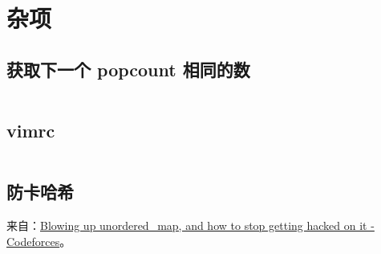 \section{杂项}

\subsection{获取下一个 popcount 相同的数}

\inputminted{cpp}{src/misc/next_hamming.hpp}

\subsection{vimrc}

\inputminted{vim}{src/misc/vimrc}

\subsection{防卡哈希}

来自：\href{https://codeforces.com/blog/entry/62393}{Blowing up unordered\_map,
and how to stop getting hacked on it - Codeforces}。

\inputminted{cpp}{src/misc/custom_hash.cpp}
